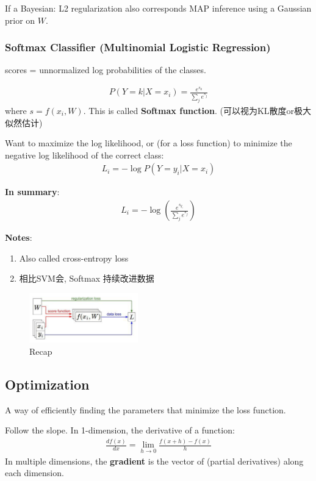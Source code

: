 If a Bayesian: L2 regularization also corresponds MAP inference using a Gaussian prior on $W$. 

\subsubsection{Softmax Classifier (Multinomial Logistic Regression)}
scores = unnormalized log probabilities of the classes.

\begin{align*}
    P(Y=k|X=x_i)=\frac{e^{s_k}}{\sum_j e^{s_j}}
\end{align*}
where $s=f(x_i, W)$. This is called \textbf{Softmax function}. (可以视为KL散度or极大似然估计)

Want to maximize the log likelihood, or (for a loss function) to minimize the negative log likelihood of the correct class:
\begin{align*}
    L_i=-\log P(Y=y_i|X=x_i)
\end{align*}

\textbf{In summary}:
\begin{align*}
    L_i=-\log\left(  \frac{e^{s_{y_i}}}{\sum_j e^{s_j}}\right)
\end{align*}

\textbf{Notes}:
\begin{enumerate}\small
    \item  Also called cross-entropy loss
    \item 相比SVM会, Softmax 持续改进数据
\end{enumerate}

\begin{figure}[!htb]
    \centering
    \includegraphics[width=0.42\textwidth]{pic/Lec3/Recap.png}
    \caption{Recap}
\end{figure}

\subsection{Optimization}
A way of efficiently finding the parameters that minimize the loss function.

Follow the slope. In 1-dimension, the derivative of a function:
\begin{align*}
    \frac{df(x)}{dx}=\lim_{h\rightarrow 0}\frac{f(x+h)-f(x)}{h}
\end{align*}
In multiple dimensions, the \textbf{gradient} is the vector of (partial derivatives) along each dimension. 

